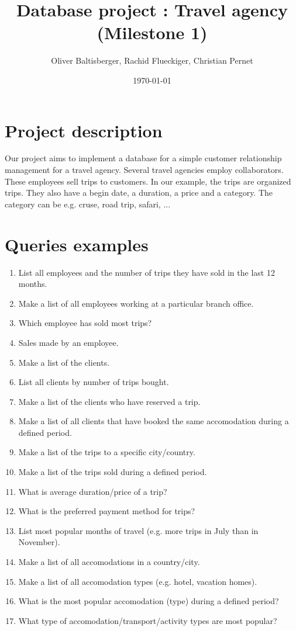 \documentclass{article}
\title{Database project : Travel agency \\ (Milestone 1)}
\author{Oliver Baltisberger, Rachid Flueckiger, Christian Pernet}
\date{\today}
\begin{document}
	\maketitle
	
	\section*{Project description}
	Our project aims to implement a database for a simple customer relationship management 
	for a travel agency. 
	Several travel agencies employ collaborators. These employees sell trips to 
	customers. 
	In our example, the trips are organized trips. They also have a begin date, a 
	duration, a price and a category. 
	The category can be e.g. cruse, road trip, safari, ...
	
	\section*{Queries examples}
			
			\begin{enumerate}
				\item List all employees and the number of trips they have 
							sold in the last 12 months.
				\item Make a list of all employees working at a 
							particular branch office.
				\item Which employee has sold most trips?
				\item Sales made by an employee. 
				\item Make a list of the clients.
				\item List all clients by number of trips bought.
				\item Make a list of the clients who have reserved a trip.
				\item Make a list of all clients that have booked the same accomodation 
							during a defined period.
				\item Make a list of the trips to a specific city/country. 
				\item Make a list of the trips sold during a defined period.
				\item What is average duration/price of a trip?
				\item What is the preferred payment method for trips?
				\item List most popular months of travel (e.g. more 
							trips in July than in November).
				\item Make a list of all accomodations in a country/city. 
				\item Make a list of all accomodation types 
							(e.g. hotel, vacation homes).
				\item What is the most popular accomodation (type) during a 
				      defined period?
				\item What type of accomodation/transport/activity 
							types are most popular?
	
				\end{enumerate}	
				
\end{document}

